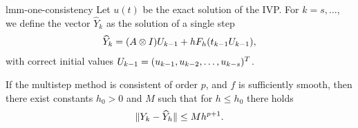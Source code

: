 \begin{Lemma}{lmm-one-consistency}
  Let $u(t)$ be the exact solution of the IVP. For $k=s,\ldots$, we
  define the vector $\widehat Y_{k}$ as the solution of a single step
  \begin{gather*}
    \widehat Y_{k} = (A\otimes I) U_{k-1} + h F_h(t_{k-1} U_{k-1}),
  \end{gather*}
  with correct initial values $U_{k-1} =
  (u_{k-1},u_{k-2},\dots,u_{k-s})^T$.
  
  If the multistep method is consistent of order $p$, and $f$ is
  sufficiently smooth, then there exist constants $h_0>0$  and $M$
  such that for $h\le h_0$ there holds
  \begin{gather}
    \label{eq:lmm-one-consistency:1}
    \lVert Y_k-\widehat Y_h\rVert \le M h^{p+1}.
  \end{gather}
\end{Lemma}


